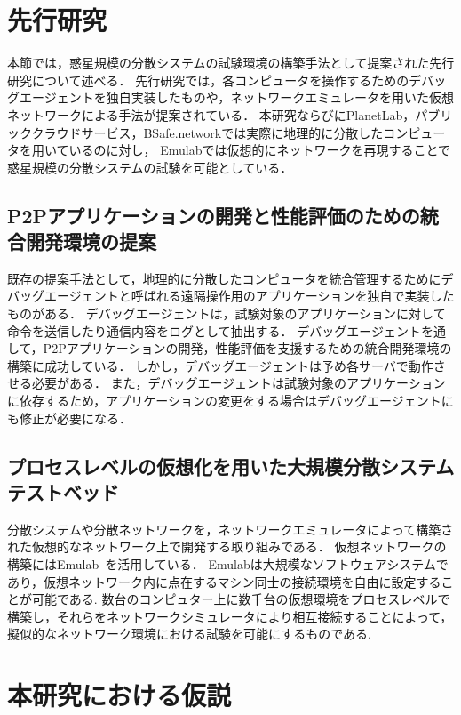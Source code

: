 \section{先行研究}
\label{issue:previous-research}

本節では，惑星規模の分散システムの試験環境の構築手法として提案された先行研究について述べる．
先行研究では，各コンピュータを操作するためのデバッグエージェントを独自実装したものや，ネットワークエミュレータを用いた仮想ネットワークによる手法が提案されている．
本研究ならびにPlanetLab，パブリッククラウドサービス，BSafe.networkでは実際に地理的に分散したコンピュータを用いているのに対し，
Emulabでは仮想的にネットワークを再現することで惑星規模の分散システムの試験を可能としている．

\subsection{P2Pアプリケーションの開発と性能評価のための統合開発環境の提案}

既存の提案手法として，地理的に分散したコンピュータを統合管理するためにデバッグエージェントと呼ばれる遠隔操作用のアプリケーションを独自で実装したものがある．
デバッグエージェントは，試験対象のアプリケーションに対して命令を送信したり通信内容をログとして抽出する．
デバッグエージェントを通して，P2Pアプリケーションの開発，性能評価を支援するための統合開発環境の構築に成功している．
しかし，デバッグエージェントは予め各サーバで動作させる必要がある．
また，デバッグエージェントは試験対象のアプリケーションに依存するため，アプリケーションの変更をする場合はデバッグエージェントにも修正が必要になる．

\subsection{プロセスレベルの仮想化を用いた大規模分散システムテストベッド}
\label{consideration:related-works:emulab}

分散システムや分散ネットワークを，ネットワークエミュレータによって構築された仮想的なネットワーク上で開発する取り組みである．
仮想ネットワークの構築にはEmulab~\cite{Emulab}を活用している．
Emulabは大規模なソフトウェアシステムであり，仮想ネットワーク内に点在するマシン同士の接続環境を自由に設定することが可能である.
数台のコンピュター上に数千台の仮想環境をプロセスレベルで構築し，それらをネットワークシミュレータにより相互接続することによって，擬似的なネットワーク環境における試験を可能にするものである.

\section{本研究における仮説}
\label{issue:hypothesis}

